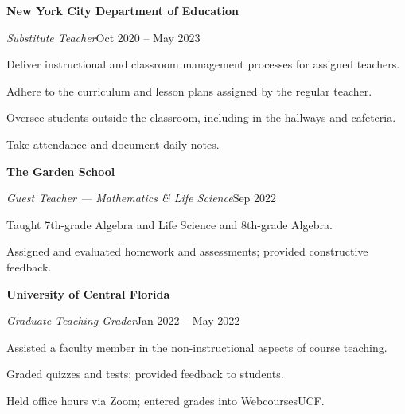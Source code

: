 \documentclass[a4paper, 12pt]{article}
\newcommand{\workplace}[1]{%
  \noindent\textbf{#1}\par
}
\newcommand{\workrole}[2]{%
  \noindent\hspace*{1em}\textit{#1}\hfill #2\par
}
\newcommand{\workunit}[1]{%
  \noindent\hspace*{1em}{\small\itshape #1}\par
}
\begin{document}
\begin{flushleft}
\vspace{8pt}

\noindent\begin{minipage}{\linewidth}
\workplace{New York City Department of Education}
\workrole{Substitute Teacher}{Oct 2020 -- May 2023}
\begin{compactitem}
    \item Deliver instructional and classroom management processes for assigned teachers.
    \item Adhere to the curriculum and lesson plans assigned by the regular teacher.
    \item Oversee students outside the classroom, including in the hallways and cafeteria.
    \item Take attendance and document daily notes.
\end{compactitem}
\end{minipage}

\vspace{8pt}

\noindent\begin{minipage}{\linewidth}
\workplace{The Garden School}
\workrole{Guest Teacher --- Mathematics \& Life Science}{Sep 2022}
\begin{compactitem}
    \item Taught 7th-grade Algebra and Life Science and 8th-grade Algebra.
    \item Assigned and evaluated homework and assessments; provided constructive feedback.
\end{compactitem}
\end{minipage}

\vspace{8pt}

\noindent\begin{minipage}{\linewidth}
\workplace{University of Central Florida}
\workrole{Graduate Teaching Grader}{Jan 2022 -- May 2022}
\workunit{Department of Mathematics}
\begin{compactitem}
    \item Assisted a faculty member in the non-instructional aspects of course teaching.
    \item Graded quizzes and tests; provided feedback to students.
    \item Held office hours via Zoom; entered grades into WebcoursesUCF.
\end{compactitem}
\end{minipage}

\vspace{4pt}


\end{flushleft}
\end{document}
